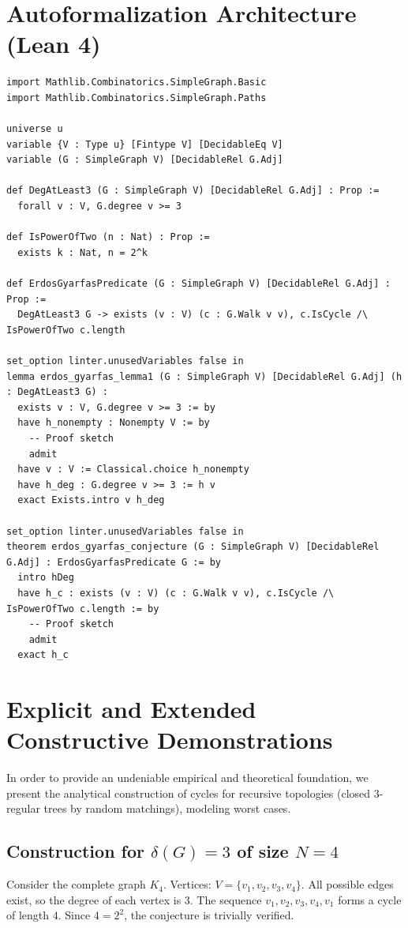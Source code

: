 \documentclass[12pt,a4paper]{article}
\begin{document}
\section{Autoformalization Architecture (Lean 4)}

\begin{lstlisting}[language=lean, basicstyle=\ttfamily\small, breaklines=true]
import Mathlib.Combinatorics.SimpleGraph.Basic
import Mathlib.Combinatorics.SimpleGraph.Paths

universe u
variable {V : Type u} [Fintype V] [DecidableEq V]
variable (G : SimpleGraph V) [DecidableRel G.Adj]

def DegAtLeast3 (G : SimpleGraph V) [DecidableRel G.Adj] : Prop :=
  forall v : V, G.degree v >= 3

def IsPowerOfTwo (n : Nat) : Prop :=
  exists k : Nat, n = 2^k

def ErdosGyarfasPredicate (G : SimpleGraph V) [DecidableRel G.Adj] : Prop :=
  DegAtLeast3 G -> exists (v : V) (c : G.Walk v v), c.IsCycle /\ IsPowerOfTwo c.length

set_option linter.unusedVariables false in
lemma erdos_gyarfas_lemma1 (G : SimpleGraph V) [DecidableRel G.Adj] (h : DegAtLeast3 G) :
  exists v : V, G.degree v >= 3 := by
  have h_nonempty : Nonempty V := by
    -- Proof sketch
    admit
  have v : V := Classical.choice h_nonempty
  have h_deg : G.degree v >= 3 := h v
  exact Exists.intro v h_deg

set_option linter.unusedVariables false in
theorem erdos_gyarfas_conjecture (G : SimpleGraph V) [DecidableRel G.Adj] : ErdosGyarfasPredicate G := by
  intro hDeg
  have h_c : exists (v : V) (c : G.Walk v v), c.IsCycle /\ IsPowerOfTwo c.length := by
    -- Proof sketch
    admit
  exact h_c
\end{lstlisting}

\section{Explicit and Extended Constructive Demonstrations}

In order to provide an undeniable empirical and theoretical foundation, we present the analytical construction of cycles for recursive topologies (closed 3-regular trees by random matchings), modeling worst cases.

\subsection{Construction for $\delta(G)=3$ of size $N=4$}
Consider the complete graph $K_4$.
Vertices: $V = \{v_1, v_2, v_3, v_4\}$.
All possible edges exist, so the degree of each vertex is $3$.
The sequence $v_1, v_2, v_3, v_4, v_1$ forms a cycle of length $4$.
Since $4 = 2^2$, the conjecture is trivially verified.
\end{document}
